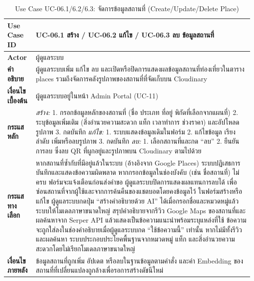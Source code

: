 \begin{table}[H]
\centering
\caption{Use Case UC-06.1/6.2/6.3: จัดการข้อมูลสถานที่ (Create/Update/Delete Place)}
\label{tab:uc06x}
\begin{tabular}{|p{3.2cm}|p{10cm}|}
\hline
\textbf{Use Case ID} & UC-06.1 สร้าง / UC-06.2 แก้ไข / UC-06.3 ลบ ข้อมูลสถานที่ \\ \hline
\textbf{Actor} & ผู้ดูแลระบบ \\ \hline
\textbf{คำอธิบาย} & ผู้ดูแลระบบเพิ่ม แก้ไข ลบ และเปิดหรือปิดการแสดงผลข้อมูลสถานที่ท่องเที่ยวในตาราง places รวมถึงจัดการคลังรูปภาพของสถานที่ที่จัดเก็บบน Cloudinary \\ \hline
\textbf{เงื่อนไขเบื้องต้น} & ผู้ดูแลระบบอยู่ในหน้า Admin Portal (UC-11) \\ \hline
\textbf{กระแสหลัก} & \textit{สร้าง:} 1. กรอกข้อมูลหลักของสถานที่ (ชื่อ ประเภท ที่อยู่ พิกัดที่เลือกจากแผนที่) 2. ระบุข้อมูลเพิ่มเติม (สิ่งอำนวยความสะดวก แท็ก เวลาทำการ ช่วงราคา) และอัปโหลดรูปภาพ 3. กดบันทึก \newline \textit{แก้ไข:} 1. ระบบแสดงข้อมูลเดิมในฟอร์ม 2. แก้ไขข้อมูล เรียงลำดับ เพิ่มหรือลบรูปภาพ 3. กดบันทึก \newline \textit{ลบ:} 1. เลือกสถานที่และกด ``ลบ'' 2. ยืนยันการลบ ซึ่งลบ QR ที่ผูกอยู่และรูปภาพบน Cloudinary ตามไปด้วย \\ \hline
\textbf{กระแสทางเลือก} & หากสถานที่ซ้ำกับที่มีอยู่แล้วในระบบ (อ้างอิงจาก Google Places) ระบบปฏิเสธการบันทึกและแสดงข้อความผิดพลาด \newline หากกรอกข้อมูลในช่องบังคับ (เช่น ชื่อสถานที่) ไม่ครบ ฟอร์มจะแจ้งเตือนก่อนส่งคำขอ \newline ผู้ดูแลระบบปิดการแสดงผลแทนการลบได้ เพื่อซ่อนสถานที่จากผู้ใช้และจากการค้นคืนของแชตบอตโดยคงข้อมูลไว้ \newline ในฟอร์มสร้างหรือแก้ไข ผู้ดูแลระบบกดปุ่ม ``สร้างคำอธิบายด้วย AI'' ได้เมื่อกรอกชื่อและหมวดหมู่แล้ว ระบบให้โมเดลภาษาขนาดใหญ่ สรุปคำอธิบายจากรีวิว Google Maps ของสถานที่และผลค้นหาจาก Serper API แล้วแสดงเป็นข้อความแนะนำพร้อมระบุแหล่งที่ใช้ ข้อความจะถูกใส่ลงในช่องคำอธิบายเมื่อผู้ดูแลระบบกด ``ใช้ข้อความนี้'' เท่านั้น หากไม่มีทั้งรีวิวและผลค้นหา ระบบประกอบประโยคพื้นฐานจากหมวดหมู่ แท็ก และสิ่งอำนวยความสะดวกโดยไม่เรียกโมเดลภาษาขนาดใหญ่ \\ \hline
\textbf{เงื่อนไขภายหลัง} & ข้อมูลสถานที่ถูกเพิ่ม อัปเดต หรือลบในฐานข้อมูลตามคำสั่ง และค่า Embedding ของสถานที่ที่เปลี่ยนแปลงถูกล้างเพื่อรอการสร้างดัชนีใหม่ \\
\hline
\end{tabular}
\end{table}

